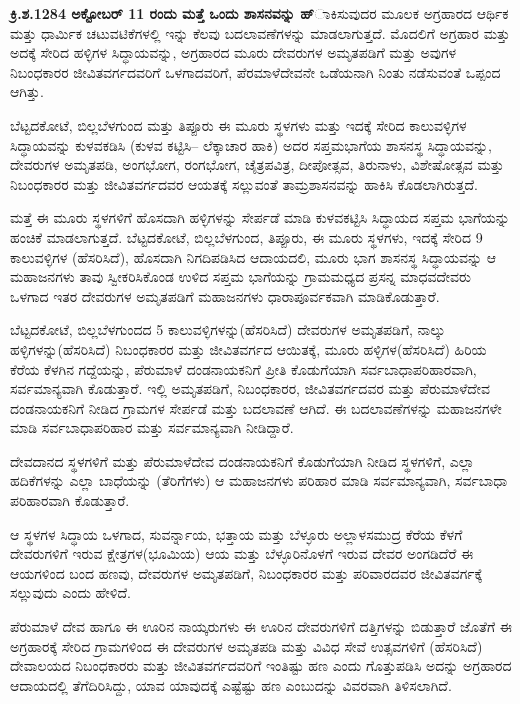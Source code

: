 \textbf{ಕ್ರಿ.ಶ.1284 ಅಕ್ಟೋಬರ್​ 11 ರಂದು ಮತ್ತೆ ಒಂದು ಶಾಸನವನ್ನು ಹ್}ಾಕಿಸುವುದರ ಮೂಲಕ ಅಗ್ರಹಾರದ ಆರ್ಥಿಕ ಮತ್ತು ಧಾರ್ಮಿಕ ಚಟುವಟಿಕೆಗಳಲ್ಲಿ ಇನ್ನು ಕೆಲವು ಬದಲಾವಣೆಗಳನ್ನು ಮಾಡಲಾಗುತ್ತದೆ. ಮೊದಲಿಗೆ ಅಗ್ರಹಾರ ಮತ್ತು ಅದಕ್ಕೆ ಸೇರಿದ ಹಳ್ಳಿಗಳ ಸಿದ್ಧಾಯವನ್ನು, ಅಗ್ರಹಾರದ ಮೂರು ದೇವರುಗಳ ಅಮೃತಪಡಿಗೆ ಮತ್ತು ಅವುಗಳ ನಿಬಂಧಕಾರರ ಜೀವಿತವರ್ಗದವರಿಗೆ ಒಳಗಾದವರಿಗೆ, ಪೆರಮಾಳೆದೇವನೇ ಒಡೆಯನಾಗಿ ನಿಂತು ನಡೆಸುವಂತೆ ಒಪ್ಪಂದ ಆಗಿತ್ತು. 

ಬೆಟ್ಟದಕೋಟೆ, ಬಿಲ್ಲಬೆಳಗುಂದ ಮತ್ತು ತಿಪ್ಪೂರು ಈ ಮೂರು ಸ್ಥಳಗಳು ಮತ್ತು ಇದಕ್ಕೆ ಸೇರಿದ ಕಾಲುವಳ್ಳಿಗಳ ಸಿದ್ಧಾಯವನ್ನು ಕುಳವಕಡಿಸಿ (ಕುಳವ ಕಟ್ಟಿಸಿ– ಲೆಕ್ಕಾಚಾರ ಹಾಕಿ) ಅದರ ಸಪ್ತಮಭಾಗೆಯ ಶಾಸನಸ್ಥ ಸಿದ್ಧಾಯವನ್ನು, ದೇವರುಗಳ ಅಮೃತಪಡಿ, ಅಂಗಭೋಗ, ರಂಗಭೋಗ, ಚೈತ್ರಪವಿತ್ರ, ದೀಪೋತ್ಸವ, ತಿರುನಾಳು, ವಿಶೇಷೋತ್ಸವ ಮತ್ತು ನಿಬಂಧಕಾರರ ಮತ್ತು ಜೀವಿತವರ್ಗದವರ ಆಯತಕ್ಕೆ ಸಲ್ಲುವಂತೆ ತಾಮ್ರಶಾಸನವನ್ನು ಹಾಕಿಸಿ ಕೊಡಲಾಗಿರುತ್ತದೆ.

ಮತ್ತೆ ಈ ಮೂರು ಸ್ಥಳಗಳಿಗೆ ಹೊಸದಾಗಿ ಹಳ್ಳಿಗಳನ್ನು ಸೇರ್ಪಡೆ ಮಾಡಿ ಕುಳವಕಟ್ಟಿಸಿ ಸಿದ್ಧಾಯದ ಸಪ್ತಮ ಭಾಗೆಯನ್ನು ಹಂಚಿಕೆ ಮಾಡಲಾಗುತ್ತದೆ. ಬೆಟ್ಟದಕೋಟೆ, ಬಿಲ್ಲಬೆಳಗುಂದ, ತಿಪ್ಪೂರು, ಈ ಮೂರು ಸ್ಥಳಗಳು, ಇದಕ್ಕೆ ಸೇರಿದ 9 ಕಾಲುವಳ್ಳಿಗಳ (ಹೆಸರಿಸಿದೆ), ಹೊಸದಾಗಿ ನಿಗದಿಪಡಿಸಿದ ಆದಾಯದಲಿ, ಮೂರು ಭಾಗ ಶಾಸನಸ್ಥ ಸಿದ್ಧಾಯವನ್ನು ಆ ಮಹಾಜನಗಳು ತಾವು ಸ್ವೀಕರಿಸಿಕೊಂಡ ಉಳಿದ ಸಪ್ತಮ ಭಾಗೆಯನ್ನು ಗ್ರಾಮಮಧ್ಯದ ಪ್ರಸನ್ನ ಮಾಧವದೇವರು ಒಳಗಾದ ಇತರ ದೇವರುಗಳ ಅಮೃತಪಡಿಗೆ ಮಹಾಜನಗಳು ಧಾರಾಪೂರ್ವಕವಾಗಿ ಮಾಡಿಕೊಡುತ್ತಾರೆ.

ಬೆಟ್ಟದಕೋಟೆ, ಬಿಲ್ಲಬೆಳಗುಂದದ 5 ಕಾಲುವಳ್ಳಿಗಳನ್ನು(ಹೆಸರಿಸಿದೆ) ದೇವರುಗಳ ಅಮೃತಪಡಿಗೆ, ನಾಲ್ಕು ಹಳ್ಳಿಗಳನ್ನು(ಹೆಸರಿಸಿದೆ) ನಿಬಂಧಕಾರರ ಮತ್ತು ಜೀವಿತವರ್ಗದ ಆಯಿತಕ್ಕೆ, ಮೂರು ಹಳ್ಳಿಗಳ(ಹೆಸರಿಸಿದೆ) ಹಿರಿಯ ಕೆರೆಯ ಕೆಳಗಿನ ಗದ್ದೆಯನ್ನು, ಪೆರುಮಾಳೆ ದಂಡನಾಯಕನಿಗೆ ಪ್ರೀತಿ ಕೊಡುಗೆಯಾಗಿ ಸರ್ವಬಾಧಾಪರಿಹಾರವಾಗಿ, ಸರ್ವಮಾನ್ಯವಾಗಿ ಕೊಡುತ್ತಾರೆ. ಇಲ್ಲಿ ಅಮೃತಪಡಿಗೆ, ನಿಬಂಧಕಾರರ, ಜೀವಿತವರ್ಗದವರ ಮತ್ತು ಪೆರುಮಾಳೆದೇವ ದಂಡನಾಯಕನಿಗೆ ನೀಡಿದ ಗ್ರಾಮಗಳ ಸೇರ್ಪಡೆ ಮತ್ತು ಬದಲಾವಣೆ ಆಗಿದೆ. ಈ ಬದಲಾವಣೆಗಳನ್ನು ಮಹಾಜನಗಳೇ ಮಾಡಿ ಸರ್ವಬಾಧಾಪರಿಹಾರ ಮತ್ತು ಸರ್ವಮಾನ್ಯವಾಗಿ ನೀಡಿದ್ದಾರೆ.

ದೇವದಾನದ ಸ್ಥಳಗಳಿಗೆ ಮತ್ತು ಪೆರುಮಾಳೆದೇವ ದಂಡನಾಯಕನಿಗೆ ಕೊಡುಗೆಯಾಗಿ ನೀಡಿದ ಸ್ಥಳಗಳಿಗೆ, ಎಲ್ಲಾ ಹದಿಕೆಗಳನ್ನು ಎಲ್ಲಾ ಬಾಧೆಯನ್ನು (ತೆರಿಗೆಗಳು) ಆ ಮಹಾಜನಗಳು ಪರಿಹಾರ ಮಾಡಿ ಸರ್ವಮಾನ್ಯವಾಗಿ, ಸರ್ವಬಾಧಾ ಪರಿಹಾರವಾಗಿ ಕೊಡುತ್ತಾರೆ.

ಆ ಸ್ಥಳಗಳ ಸಿದ್ಧಾಯ ಒಳಗಾದ, ಸುವರ್ನ್ನಾಯ, ಭತ್ತಾಯ ಮತ್ತು ಬೆಳ್ಳೂರು ಅಲ್ಲಾಳಸಮುದ್ರ ಕೆರೆಯ ಕೆಳಗೆ ದೇವರುಗಳಿಗೆ ಇರುವ ಕ್ಷೇತ್ರಗಳ(ಭೂಮಿಯ) ಆಯ ಮತ್ತು ಬೆಳ್ಳೂರಿನೊಳಗೆ ಇರುವ ದೇವರ ಅಂಗಡಿದೆರೆ ಈ ಆಯಗಳಿಂದ ಬಂದ ಹಣವು, ದೇವರುಗಳ ಅಮೃತಪಡಿಗೆ, ನಿಬಂಧಕಾರರ ಮತ್ತು ಪರಿವಾರದವರ ಜೀವಿತವರ್ಗಕ್ಕೆ ಸಲ್ಲುವುದು ಎಂದು ಹೇಳಿದೆ.

ಪೆರುಮಾಳೆ ದೇವ ಹಾಗೂ ಈ ಊರಿನ ನಾಯ್ಕರುಗಳು ಈ ಊರಿನ ದೇವರುಗಳಿಗೆ ದತ್ತಿಗಳನ್ನು ಬಿಡುತ್ತಾರೆ ಜೊತೆಗೆ ಈ ಅಗ್ರಹಾರಕ್ಕೆ ಸೇರಿದ ಗ್ರಾಮಗಳಿಂದ ಈ ದೇವರುಗಳ ಅಮೃತಪಡಿ ಮತ್ತು ವಿವಿಧ ಸೇವೆ ಉತ್ಸವಗಳಿಗೆ (ಹೆಸರಿಸಿದೆ) ದೇವಾಲಯದ ನಿಬಂಧಕಾರರು ಮತ್ತು ಜೀವಿತವರ್ಗದವರಿಗೆ ಇಂತಿಷ್ಟು ಹಣ ಎಂದು ಗೊತ್ತುಪಡಿಸಿ ಅದನ್ನು ಅಗ್ರಹಾರದ ಆದಾಯದಲ್ಲಿ ತೆಗೆದಿರಿಸಿದ್ದು, ಯಾವ ಯಾವುದಕ್ಕೆ ಎಷ್ಟೆಷ್ಟು ಹಣ ಎಂಬುದನ್ನು ವಿವರವಾಗಿ ತಿಳಿಸಲಾಗಿದೆ.

